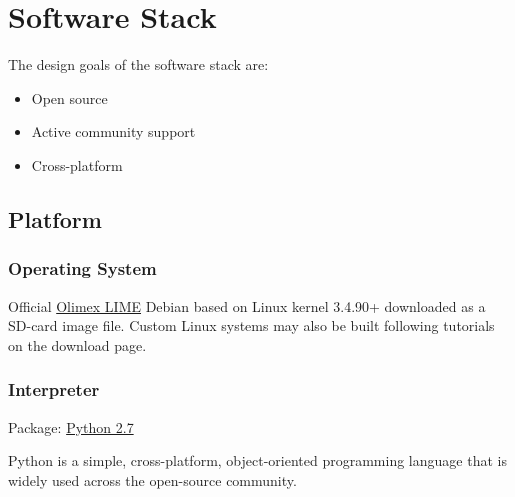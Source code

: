 \usepackage{listings}
\usepackage{color}




\section{Software Stack}

The design goals of the software stack are:
\begin{itemize}
\item Open source
\item Active community support
\item Cross-platform
\end{itemize}

\subsection{Platform}
\subsubsection{Operating System}
Official \href{https://www.olimex.com/wiki/A20-OLinuXino-LIME#How_to_generate_boot-able_SD-card_Debian_Linux_image_for_A20-OLinuXino-LIME.3F}{Olimex LIME} Debian based on Linux kernel 3.4.90+ downloaded as a SD-card image file. Custom Linux systems may also be built following tutorials on the download page.

\subsubsection{Interpreter}

Package:	\href{https://www.python.org/downloads/release/python-279/}{Python 2.7}

Python is a simple, cross-platform, object-oriented programming language that is widely used across the open-source community.

